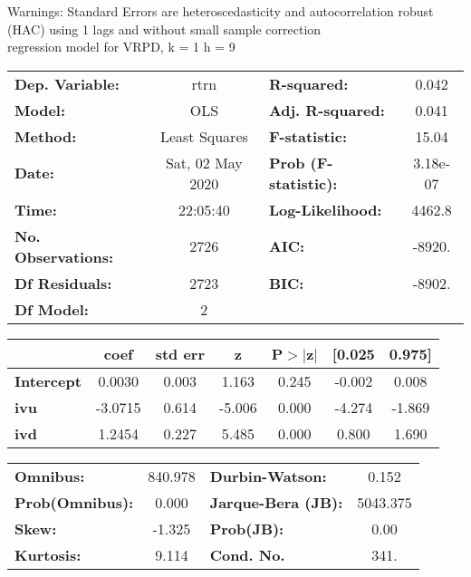 Warnings: \newline
 [1] Standard Errors are heteroscedasticity and autocorrelation robust (HAC) using 1 lags and without small sample correction\\ 

regression model for VRPD, k = 1 h = 9\begin{center}
\begin{tabular}{lclc}
\toprule
\textbf{Dep. Variable:}    &       rtrn       & \textbf{  R-squared:         } &     0.042   \\
\textbf{Model:}            &       OLS        & \textbf{  Adj. R-squared:    } &     0.041   \\
\textbf{Method:}           &  Least Squares   & \textbf{  F-statistic:       } &     15.04   \\
\textbf{Date:}             & Sat, 02 May 2020 & \textbf{  Prob (F-statistic):} &  3.18e-07   \\
\textbf{Time:}             &     22:05:40     & \textbf{  Log-Likelihood:    } &    4462.8   \\
\textbf{No. Observations:} &        2726      & \textbf{  AIC:               } &    -8920.   \\
\textbf{Df Residuals:}     &        2723      & \textbf{  BIC:               } &    -8902.   \\
\textbf{Df Model:}         &           2      & \textbf{                     } &             \\
\bottomrule
\end{tabular}
\begin{tabular}{lcccccc}
                   & \textbf{coef} & \textbf{std err} & \textbf{z} & \textbf{P$> |$z$|$} & \textbf{[0.025} & \textbf{0.975]}  \\
\midrule
\textbf{Intercept} &       0.0030  &        0.003     &     1.163  &         0.245        &       -0.002    &        0.008     \\
\textbf{ivu}       &      -3.0715  &        0.614     &    -5.006  &         0.000        &       -4.274    &       -1.869     \\
\textbf{ivd}       &       1.2454  &        0.227     &     5.485  &         0.000        &        0.800    &        1.690     \\
\bottomrule
\end{tabular}
\begin{tabular}{lclc}
\textbf{Omnibus:}       & 840.978 & \textbf{  Durbin-Watson:     } &    0.152  \\
\textbf{Prob(Omnibus):} &   0.000 & \textbf{  Jarque-Bera (JB):  } & 5043.375  \\
\textbf{Skew:}          &  -1.325 & \textbf{  Prob(JB):          } &     0.00  \\
\textbf{Kurtosis:}      &   9.114 & \textbf{  Cond. No.          } &     341.  \\
\bottomrule
\end{tabular}
\end{center}

